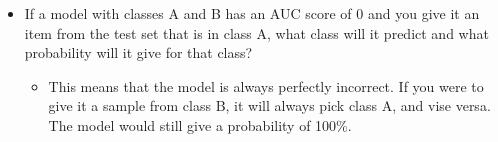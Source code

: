 \documentclass[letterpaper]{article}
\begin{document}
\begin{itemize}
\item If a model with classes A and B has an AUC score of 0 and you give it
an item from the test set that is in class A, what class will it
predict and what probability will it give for that class?

\begin{itemize}
\item This means that the model is always perfectly incorrect. If you were
to give it a sample from class B, it will always pick class A, and
vise versa. The model would still give a probability of 100\%.
\end{itemize}
\end{itemize}
\end{document}
